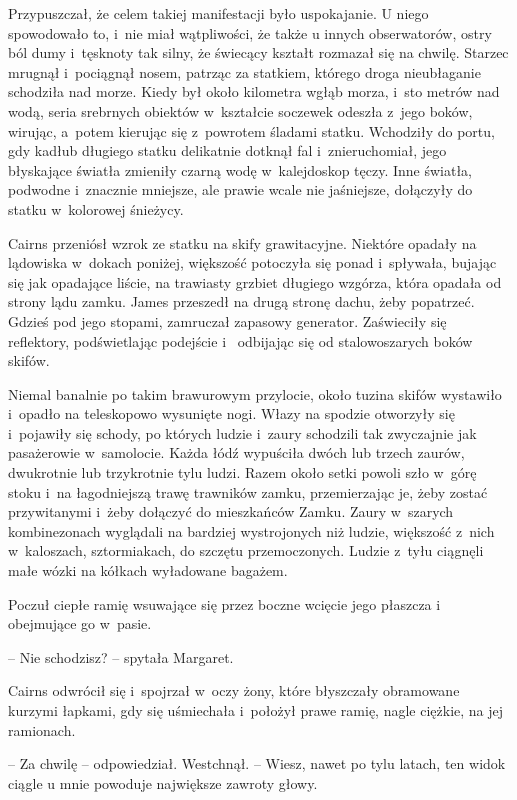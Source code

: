 \documentclass[oneside,polish,12pt,sfheadings]{mwbk}
\begin{document}
Przypuszczał, że celem takiej manifestacji było uspokajanie. U niego
spowodowało to, i~nie miał wątpliwości, że także u innych obserwatorów,
ostry ból dumy i~tęsknoty tak silny, że świecący kształt rozmazał się na
chwilę. Starzec mrugnął i~pociągnął nosem, patrząc za statkiem, którego
droga nieubłaganie schodziła nad morze. Kiedy był około kilometra wgłąb
morza, i~sto metrów nad wodą, seria srebrnych obiektów w~kształcie
soczewek odeszła z~jego boków, wirując, a~potem kierując się z~powrotem
śladami statku. Wchodziły do portu, gdy kadłub długiego statku
delikatnie dotknął fal i~znieruchomiał, jego błyskające światła zmieniły
czarną wodę w~kalejdoskop tęczy. Inne światła, podwodne i~znacznie
mniejsze, ale prawie wcale nie jaśniejsze, dołączyły do statku w~kolorowej śnieżycy.

Cairns przeniósł wzrok ze statku na skify grawitacyjne. Niektóre opadały
na lądowiska w~dokach poniżej, większość potoczyła się ponad i~spływała,
bujając się jak opadające liście, na trawiasty grzbiet długiego wzgórza,
która opadała od strony lądu zamku. James przeszedł na drugą stronę
dachu, żeby popatrzeć. Gdzieś pod jego stopami, zamruczał zapasowy
generator. Zaświeciły się reflektory, podświetlając podejście i~
odbijając się od stalowoszarych boków skifów.

Niemal banalnie po takim brawurowym przylocie, około tuzina skifów
wystawiło i~opadło na teleskopowo wysunięte nogi. Włazy na spodzie
otworzyły się i~pojawiły się schody, po których ludzie i~zaury schodzili
tak zwyczajnie jak pasażerowie w~samolocie. Każda łódź wypuściła dwóch
lub trzech zaurów, dwukrotnie lub trzykrotnie tylu ludzi. Razem około
setki powoli szło w~górę stoku i~na łagodniejszą trawę trawników zamku,
przemierzając je, żeby zostać przywitanymi i~żeby dołączyć do
mieszkańców Zamku. Zaury w~szarych kombinezonach wyglądali na bardziej
wystrojonych niż ludzie, większość z~nich w~kaloszach, sztormiakach, do
szczętu przemoczonych. Ludzie z~tyłu ciągnęli małe wózki na kółkach
wyładowane bagażem.

Poczuł ciepłe ramię wsuwające się przez boczne wcięcie jego płaszcza i~
obejmujące go w~pasie.

-- Nie schodzisz? -- spytała Margaret.

Cairns odwrócił się i~spojrzał w~oczy żony, które błyszczały obramowane
kurzymi łapkami, gdy się uśmiechała i~położył prawe ramię, nagle
ciężkie, na jej ramionach.

-- Za chwilę -- odpowiedział. Westchnął. -- Wiesz, nawet po tylu latach,
ten widok ciągle u mnie powoduje największe zawroty głowy.
\end{document}
